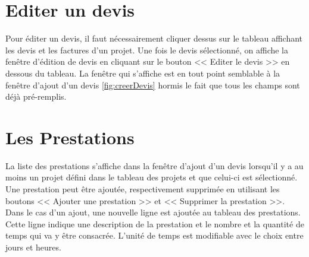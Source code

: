 \section{Editer un devis}
Pour éditer un devis, il faut nécessairement cliquer dessus sur le tableau affichant les devis et les factures d'un projet. Une fois le devis sélectionné, on affiche la fenêtre d'édition de devis en cliquant sur le bouton << Editer le devis >> en dessous du tableau.
La fenêtre qui s'affiche est en tout point semblable à la fenêtre d'ajout d'un devis \ref{fig:creerDevis} hormis le fait que tous les champs sont déjà pré-remplis.

\section{Les Prestations}
\label{ch:Prestations}
La liste des prestations s'affiche dans la fenêtre d'ajout d'un devis lorsqu'il y a au moins un projet défini dans le tableau des projets et que celui-ci est sélectionné. Une prestation peut être ajoutée, respectivement supprimée en utilisant les boutons << Ajouter une prestation >> et << Supprimer la prestation >>. Dans le cas d'un ajout, une nouvelle ligne est ajoutée au tableau des prestations. Cette ligne indique une description de la prestation et le nombre et la quantité de temps qui va y être consacrée. L'unité de temps est modifiable avec le choix entre jours et heures.

